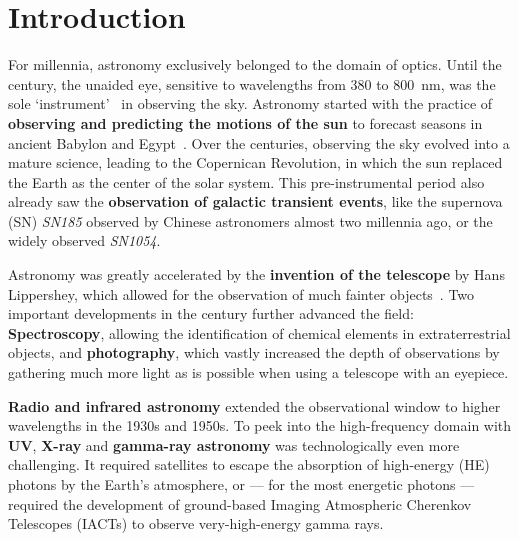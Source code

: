 \chapter*{Introduction}\label{introduction}
For millennia, astronomy exclusively belonged to the domain of optics. Until the  century, the unaided eye, sensitive to wavelengths from \num{380} to \SI{800}{\nano\m}, was the sole `instrument'~ in observing the sky. Astronomy started with the practice of \textbf{observing and predicting the motions of the sun} to forecast seasons in ancient Babylon and Egypt~. Over the centuries, observing the sky evolved into a mature science, leading to the Copernican Revolution, in which the sun replaced the Earth as the center of the solar system. This pre-instrumental period also already saw the \textbf{observation of galactic transient events}, like the supernova (SN) \emph{SN185} observed by Chinese astronomers almost two millennia ago, or the widely observed \emph{SN1054}.

Astronomy was greatly accelerated by the \textbf{invention of the telescope} by Hans Lippershey, which allowed for the observation of much fainter objects~. Two important developments in the  century further advanced the field: \textbf{Spectroscopy}, allowing the identification of chemical elements in extraterrestrial objects, and \textbf{photography}, which vastly increased the depth of observations by gathering much more light as is possible when using a telescope with an eyepiece.

\textbf{Radio and infrared astronomy} extended the observational window to higher wavelengths in the 1930s and 1950s. To peek into the high-frequency domain with \textbf{UV}, \textbf{X-ray} and \textbf{gamma-ray astronomy} was technologically even more challenging. It required satellites to escape the absorption of high-energy (HE) photons by the Earth's atmosphere, or --- for the most energetic photons --- required the development of ground-based Imaging Atmospheric Cherenkov Telescopes (IACTs) to observe very-high-energy gamma rays.

